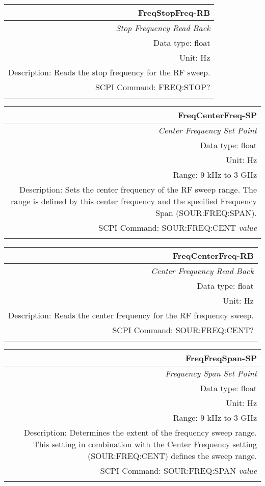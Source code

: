 \documentclass[openany]{article}
\begin{document}
		\begin{tabular}{N}
			\hline
			\bfseries FreqStopFreq-RB \\ \hline
			\emph{Stop Frequency Read Back} \\
			Data type: float \\
			Unit: Hz \\
			Description: Reads the stop frequency for the RF sweep. \\
			SCPI Command: FREQ:STOP? \\
			\\

		\end{tabular}


		\begin{tabular}{N}
			\hline
			\bfseries FreqCenterFreq-SP \\ \hline
			\emph{Center Frequency Set Point} \\
			Data type: float \\
			Unit: Hz \\
			Range: 9 kHz to 3 GHz \\
			Description: Sets the center frequency of the RF sweep range. The range is defined by this center frequency and the specified Frequency Span (SOUR:FREQ:SPAN). \\
			SCPI Command: SOUR:FREQ:CENT \emph{value} \\
			\\
			
		\end{tabular}


		\begin{tabular}{N}
			\hline
			\bfseries FreqCenterFreq-RB \\ \hline
			\emph{Center Frequency Read Back} \\
			Data type: float \\
			Unit: Hz \\
			Description: Reads the center frequency for the RF frequency sweep. \\
			SCPI Command: SOUR:FREQ:CENT? \\
			\\

		\end{tabular}


		\begin{tabular}{N}
			\hline
			\bfseries FreqFreqSpan-SP \\ \hline
			\emph{Frequency Span Set Point} \\
			Data type: float \\
			Unit: Hz \\
			Range: 9 kHz to 3 GHz \\
			Description: Determines the extent of the frequency sweep range. This setting in combination with the Center Frequency setting (SOUR:FREQ:CENT) defines the sweep range. \\
			SCPI Command: SOUR:FREQ:SPAN \emph{value} \\
			\\
			
		\end{tabular}
\end{document}
